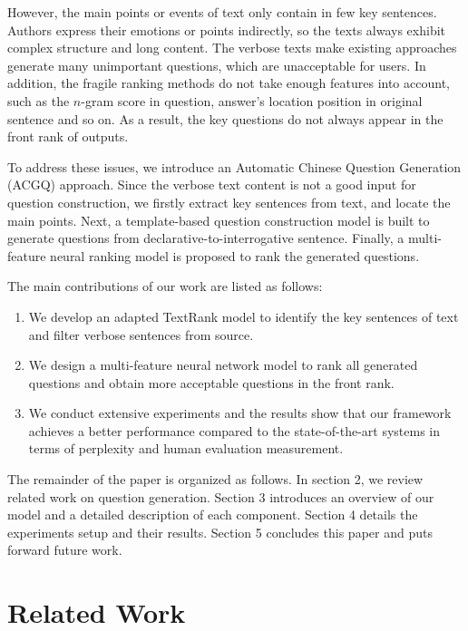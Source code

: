 \documentclass[runningheads,UTF8,article]{comsis2}
\newcommand\revised[1]{{\color{black} #1}}
\begin{document}
	However, the main points or events of text only contain in few key sentences. Authors express their emotions or points indirectly, so the texts always exhibit complex structure and long content. The verbose texts make existing approaches generate many unimportant questions, which are unacceptable for users. 
	In addition, the fragile ranking methods do not take enough features into account, such as the $n$-gram score in question, answer's location position in original sentence and so on. As a result, the key questions do not always appear in the front rank of outputs. 
	
	
	
	To address these issues, we introduce an Automatic Chinese Question Generation (ACGQ) approach. Since the verbose text content is not a good input for question construction, we firstly extract key sentences from text, and locate the main points. Next, a template-based question construction model is built to generate questions from declarative-to-interrogative sentence. Finally, a multi-feature neural ranking model is proposed to rank the generated questions.
	
	The main contributions of our work are listed as follows:
	\begin{enumerate}
		\item {We develop an adapted TextRank model to identify the key sentences of text and filter verbose sentences from source.}
		\item{We design a multi-feature neural network model to rank all generated questions and obtain more acceptable questions in the front rank.}
		\item{We conduct extensive experiments and the results show that our framework achieves a better performance \revised{compared to} the state-of-the-art systems in terms of perplexity and human evaluation measurement.}
	\end{enumerate}
	
	
	The remainder of the paper is organized as follows. In section 2, we review related work on question generation. Section 3 introduces an overview of our model and a detailed description of each component. Section 4 details the experiments setup and their results. Section 5 concludes this paper and puts forward future work. 	
	
	
	
	\section{Related Work}
	
\end{document}
